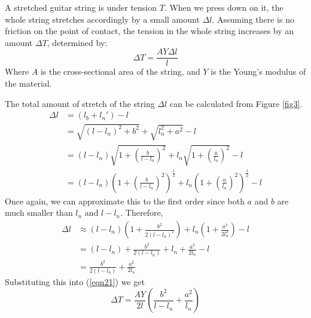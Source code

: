 A stretched guitar string is under tension $T$. When we press down on it, the whole string stretches accordingly by a small amount $\Delta l$. Assuming there is no friction on the point of contact, the tension in the whole string increases by an amount $\Delta T$, determined by:
\begin{equation}
    \Delta T = \frac{AY\Delta l}{l}\label{eqn21}
\end{equation} 
Where $A$ is the cross-sectional area of the string, and $Y$ is the Young's modulus of the material. \cite{polak} \par
The total amount of stretch of the string $\Delta l$ can be calculated from Figure \ref{fig3}. 
\begin{align}
    \Delta l &= (l_b + l_n') - l \\
    &= \sqrt{(l-l_n)^2+b^2} + \sqrt{l_n^2+a^2} - l \\
    &= (l-l_n)\sqrt{1+\left(\frac{b}{l-l_n}\right)^2} + l_n\sqrt{1+\left(\frac{a}{l_n}\right)^2} - l\\
    &= (l-l_n)\left(1+\left(\frac{b}{l-l_n}\right)^2\right)^{\frac{1}{2}} + l_n\left(1+\left(\frac{a}{l_n}\right)^2\right)^{\frac{1}{2}} - l
\end{align}
Once again, we can approximate this to the first order since both $a$ and $b$ are much smaller than $l_n$ and $l-l_n$. Therefore,
\begin{align}
    \Delta l &\approx (l-l_n)\left(1+\frac{b^2}{2(l-l_n)^2}\right)+ l_n\left(1+\frac{a^2}{2l_n^2}\right) - l \label{eqn26} \\
    &= (l - l_n) + \frac{b^2}{2(l-l_n)} + l_n + \frac{a^2}{2l_n} - l \\
    &= \frac{b^2}{2(l-l_n)} + \frac{a^2}{2l_n}
\end{align}
Substituting this into (\ref{eqn21}) we get
\begin{equation}
    \Delta T = \frac{AY}{2l} \left( \frac{b^2}{l-l_n} + \frac{a^2}{l_n} \right) \label{eqn29}
\end{equation}
